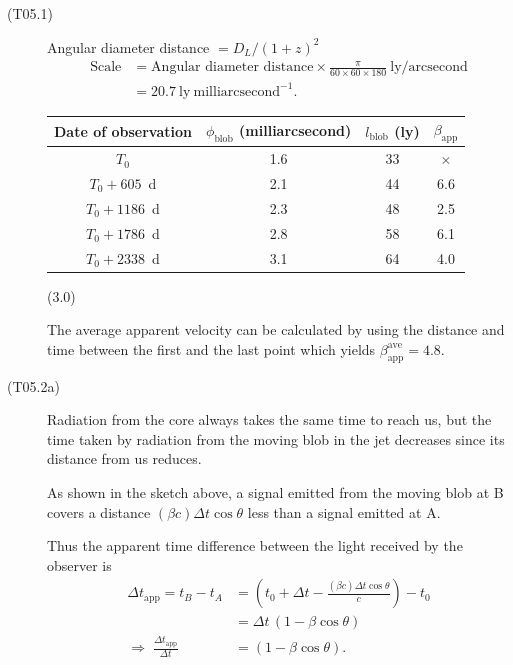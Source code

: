 \begin{description}
\item[(T05.1)] Angular diameter distance $= D_L/(1+z)^2$
  \begin{align*}
  \text{Scale} &= \text{Angular diameter distance} \times
    \frac{\pi}{60 \times 60 \times 180}~\mathrm{ly/arcsecond} \\
  &= 20.7~\mathrm{ly~milliarcsecond^{-1}}.
  \tag*{(1.0)}
  \end{align*}
  \begin{center}
  \begin{tabular}{cccc}
  Date of observation & $\phi_{\mathrm{blob}}$ (milliarcsecond)
    & $l_{\mathrm{blob}}$ (ly) & $\beta_{\mathrm{app}}$ \\
  \hline
  $T_0$            & 1.6 & 33 & $\times$ \\
  $T_0 + 605$~d    & 2.1 & 44 & 6.6 \\
  $T_0 + 1186$~d   & 2.3 & 48 & 2.5 \\
  $T_0 + 1786$~d   & 2.8 & 58 & 6.1 \\
  $T_0 + 2338$~d   & 3.1 & 64 & 4.0 \\
  \end{tabular}
  \hfill(3.0)
  \end{center}
  The average apparent velocity can be calculated by using the distance and
  time between the first and the last point which yields
  $\beta^{\mathrm{ave}}_{\mathrm{app}} = 4.8$.

\item[(T05.2a)] Radiation from the core always takes the same time to reach
  us, but the time taken by radiation from the moving blob in the jet
  decreases since its distance from us reduces.

  As shown in the sketch above, a signal emitted from the moving blob at B
  covers a distance $(\beta c)\Delta t \cos\theta$ less than a signal emitted
  at A.

  Thus the apparent time difference between the light received by the
  observer is
  \begin{align*}
  \Delta t_{\mathrm{app}} = t_B - t_A
  &= \left(t_0 + \Delta t - \frac{(\beta c)\Delta t \cos\theta}{c}\right)
     - t_0 \\
  &= \Delta t\,(1 - \beta\cos\theta) \\
  \Longrightarrow\;
  \frac{\Delta t_{\mathrm{app}}}{\Delta t}
  &= (1 - \beta\cos\theta).
  \tag*{(2.0)}
  \end{align*}


\end{description}
